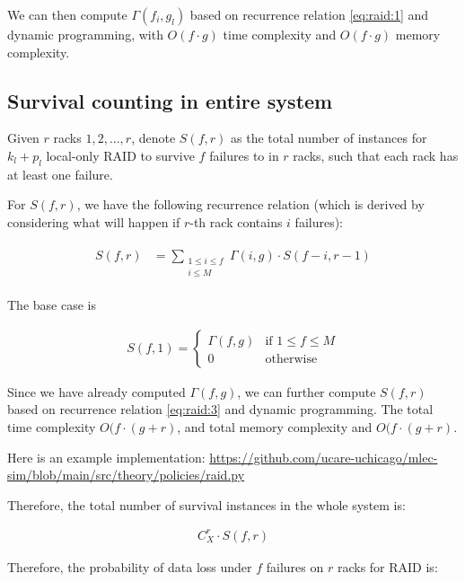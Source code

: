 \documentclass{article}
\begin{document}
We can then compute $\Gamma(f_i, g_l)$ based on recurrence relation \ref{eq:raid:1} and dynamic programming, with $O(f \cdot g)$ time complexity and $O(f \cdot g)$ memory complexity.


\subsection{Survival counting in entire system}

Given $r$ racks $1,2,...,r$, denote $S(f,r)$ as the total number of instances for $k_l+p_l$ local-only RAID to survive $f$ failures to in $r$ racks, such that each rack has at least one failure.

For $S(f,r)$, we have the following recurrence relation (which is derived by considering what will happen if $r$-th rack contains $i$ failures):

\begin{eqnarray}
\begin{aligned}
  S(f,r)
  &= \sum_{\substack{1 \leq i \leq f \\ i \leq M}} \Gamma(i,g) \cdot S(f-i, r-1)
\end{aligned}
\label{eq:raid:3}
\end{eqnarray}

The base case is 

\begin{eqnarray}
  S(f,1) =
    \begin{cases}
      \Gamma(f,g)& \text{if $1 \leq f \leq M$}\\
      0 & \text{otherwise}
    \end{cases}       
\label{eq:raid:4}
\end{eqnarray}

Since we have already computed $\Gamma(f,g)$, we can further compute $S(f,r)$ based on recurrence relation \ref{eq:raid:3} and dynamic programming. The total time complexity $O(f \cdot (g+r)$, and total memory complexity and $O(f \cdot (g+r)$.

Here is an example implementation: \url{https://github.com/ucare-uchicago/mlec-sim/blob/main/src/theory/policies/raid.py}

Therefore, the total number of survival instances in the whole system is:

\begin{eqnarray}
C_{X}^{r} \cdot S(f,r)
\label{eq:raid:5}
\end{eqnarray}

Therefore, the probability of data loss under $f$ failures on $r$ racks for RAID is:
\end{document}
